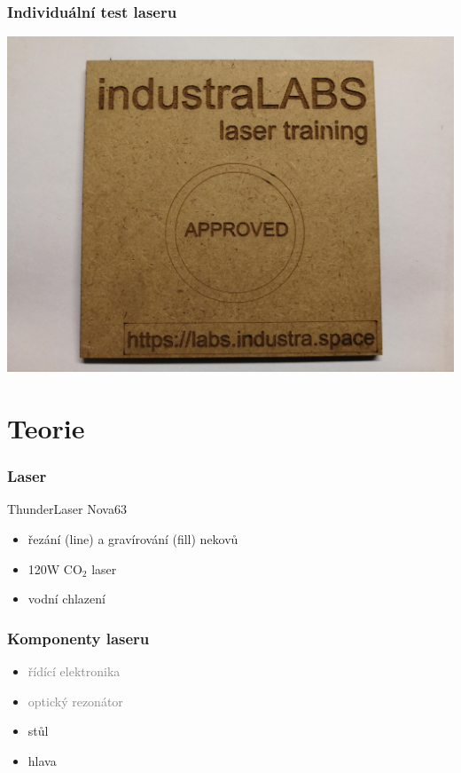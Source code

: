 \documentclass[14pt]{beamer}
\begin{document}
\begin{frame}
\frametitle{Individuální test laseru}
\centering
\includegraphics[scale=0.06]{imgs/approved.jpg}

\end{frame}

\section{Teorie}

\begin{frame}
\frametitle{Laser}

\begin{block}{ThunderLaser Nova63}
\begin{itemize}
\item řezání (line) a gravírování (fill) nekovů
\item 120W CO$_{2}$ laser
\item vodní chlazení
\end{itemize}
\end{block}



\end{frame}

\begin{frame}
\frametitle{Komponenty laseru}
\begin{itemize}
	\item \textcolor{gray}{řídící elektronika}
	\item \textcolor{gray}{optický rezonátor}
	\item stůl
	\item hlava

	
\end{itemize}
\end{frame}
\end{document}
